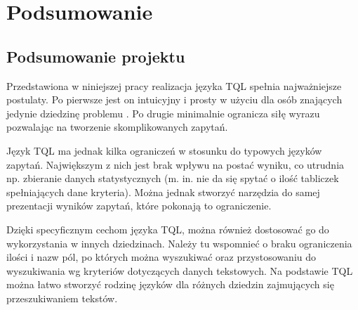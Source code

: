 \chapter*{Podsumowanie}
% 

\section*{Podsumowanie projektu}
Przedstawiona w niniejszej pracy realizacja języka TQL spełnia najważniejsze postulaty. Po pierwsze jest on intuicyjny i prosty w użyciu dla osób znających jedynie dziedzinę problemu%
. Po drugie minimalnie ogranicza siłę wyrazu pozwalając na tworzenie skomplikowanych zapytań.

Język TQL ma jednak kilka ograniczeń w stosunku do typowych języków zapytań. Największym z nich jest brak wpływu na postać wyniku, co utrudnia np. zbieranie danych statystycznych (m. in. nie da się spytać o ilość tabliczek spełniających dane kryteria). Można jednak stworzyć narzędzia do samej prezentacji wyników zapytań, które pokonają to ograniczenie. 


Dzięki specyficznym cechom języka TQL, można również dostosować go do wykorzystania w innych dziedzinach. Należy tu wspomnieć o braku ograniczenia ilości i nazw pól, po których można wyszukiwać oraz przystosowaniu do wyszukiwania wg kryteriów dotyczących danych tekstowych. Na podstawie TQL można łatwo stworzyć rodzinę języków dla różnych dziedzin zajmujących się przeszukiwaniem tekstów.

